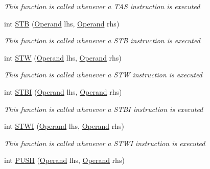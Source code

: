 \begin{DoxyCompactItemize}
\begin{DoxyCompactList}\small\item\em This function is called whenever a T\+A\+S instruction is executed \end{DoxyCompactList}\item 
int \hyperlink{class_c_p_u___o_s___simulator_1_1_c_p_u_1_1_instruction_a26aa3d1a1f62f61acc3b37c7d57743f1}{S\+T\+B} (\hyperlink{class_c_p_u___o_s___simulator_1_1_c_p_u_1_1_operand}{Operand} lhs, \hyperlink{class_c_p_u___o_s___simulator_1_1_c_p_u_1_1_operand}{Operand} rhs)
\begin{DoxyCompactList}\small\item\em This function is called whenever a S\+T\+B instruction is executed \end{DoxyCompactList}\item 
int \hyperlink{class_c_p_u___o_s___simulator_1_1_c_p_u_1_1_instruction_aa1bc7540a41bcd8ab9273cfac88a5bf8}{S\+T\+W} (\hyperlink{class_c_p_u___o_s___simulator_1_1_c_p_u_1_1_operand}{Operand} lhs, \hyperlink{class_c_p_u___o_s___simulator_1_1_c_p_u_1_1_operand}{Operand} rhs)
\begin{DoxyCompactList}\small\item\em This function is called whenever a S\+T\+W instruction is executed \end{DoxyCompactList}\item 
int \hyperlink{class_c_p_u___o_s___simulator_1_1_c_p_u_1_1_instruction_a2724896fa80e3da440271b6dba5421a3}{S\+T\+B\+I} (\hyperlink{class_c_p_u___o_s___simulator_1_1_c_p_u_1_1_operand}{Operand} lhs, \hyperlink{class_c_p_u___o_s___simulator_1_1_c_p_u_1_1_operand}{Operand} rhs)
\begin{DoxyCompactList}\small\item\em This function is called whenever a S\+T\+B\+I instruction is executed \end{DoxyCompactList}\item 
int \hyperlink{class_c_p_u___o_s___simulator_1_1_c_p_u_1_1_instruction_aec8b426958aee888d46d9cbb565ed548}{S\+T\+W\+I} (\hyperlink{class_c_p_u___o_s___simulator_1_1_c_p_u_1_1_operand}{Operand} lhs, \hyperlink{class_c_p_u___o_s___simulator_1_1_c_p_u_1_1_operand}{Operand} rhs)
\begin{DoxyCompactList}\small\item\em This function is called whenever a S\+T\+W\+I instruction is executed \end{DoxyCompactList}\item 
int \hyperlink{class_c_p_u___o_s___simulator_1_1_c_p_u_1_1_instruction_a4a6711b8309af629c9460cdadc340444}{P\+U\+S\+H} (\hyperlink{class_c_p_u___o_s___simulator_1_1_c_p_u_1_1_operand}{Operand} lhs, \hyperlink{class_c_p_u___o_s___simulator_1_1_c_p_u_1_1_operand}{Operand} rhs)

\end{DoxyCompactItemize}
